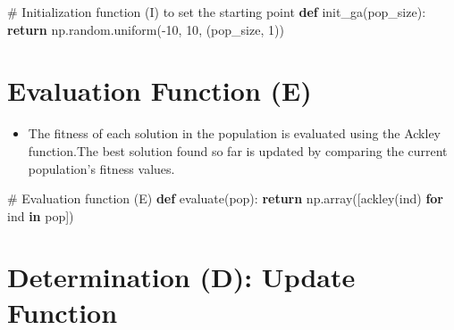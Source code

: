 \documentclass[
  letterpaper,
  DIV=11,
  numbers=noendperiod]{scrreprt}
\newenvironment{Shaded}{\begin{snugshade}}{\end{snugshade}}
\newcommand{\CommentTok}[1]{\textcolor[rgb]{0.37,0.37,0.37}{#1}}
\newcommand{\ControlFlowTok}[1]{\textcolor[rgb]{0.00,0.23,0.31}{\textbf{#1}}}
\newcommand{\DecValTok}[1]{\textcolor[rgb]{0.68,0.00,0.00}{#1}}
\newcommand{\KeywordTok}[1]{\textcolor[rgb]{0.00,0.23,0.31}{\textbf{#1}}}
\newcommand{\NormalTok}[1]{\textcolor[rgb]{0.00,0.23,0.31}{#1}}
\newcommand{\OperatorTok}[1]{\textcolor[rgb]{0.37,0.37,0.37}{#1}}
\providecommand{\tightlist}{%
  \setlength{\itemsep}{0pt}\setlength{\parskip}{0pt}}\usepackage{longtable,booktabs,array}
\begin{document}
\begin{Shaded}
\begin{Highlighting}[]
\CommentTok{\# Initialization function (I) to set the starting point}
\KeywordTok{def}\NormalTok{ init\_ga(pop\_size):}
    \ControlFlowTok{return}\NormalTok{ np.random.uniform(}\OperatorTok{{-}}\DecValTok{10}\NormalTok{, }\DecValTok{10}\NormalTok{, (pop\_size, }\DecValTok{1}\NormalTok{))}
\end{Highlighting}
\end{Shaded}

\section{Evaluation Function (E)}\label{evaluation-function-e}

\begin{itemize}
\tightlist
\item
  The fitness of each solution in the population is evaluated using the
  Ackley function.The best solution found so far is updated by comparing
  the current population's fitness values.
\end{itemize}

\begin{Shaded}
\begin{Highlighting}[]
\CommentTok{\# Evaluation function (E)}
\KeywordTok{def}\NormalTok{ evaluate(pop):}
    \ControlFlowTok{return}\NormalTok{ np.array([ackley(ind) }\ControlFlowTok{for}\NormalTok{ ind }\KeywordTok{in}\NormalTok{ pop])}
\end{Highlighting}
\end{Shaded}

\section{Determination (D): Update
Function}\label{determination-d-update-function}
\end{document}
